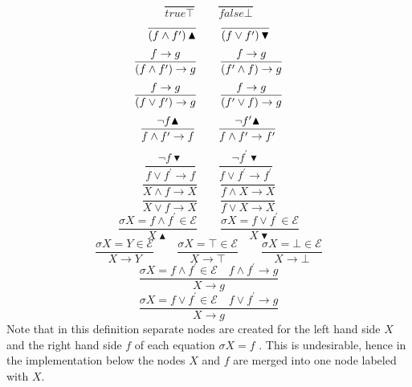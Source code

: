 \begin{equation*}
\frac{{}}{true\top }\qquad \frac{{}}{false\bot }
\end{equation*}%
\begin{equation*}
\frac{{}}{\left( f\wedge f^{\prime }\right) \blacktriangle }\qquad \frac{{}}{%
\left( f\vee f^{\prime }\right) \blacktriangledown }
\end{equation*}%
\begin{equation*}
\frac{f\rightarrow g}{(f\wedge f^{\prime })\rightarrow g}\qquad \frac{%
f\rightarrow g}{(f^{\prime }\wedge f)\rightarrow g}
\end{equation*}%
\begin{equation*}
\frac{f\rightarrow g}{(f\vee f^{\prime })\rightarrow g}\qquad \frac{%
f\rightarrow g}{(f^{\prime }\vee f)\rightarrow g}
\end{equation*}%
\begin{equation*}
\frac{\lnot f\blacktriangle }{f\wedge f^{\prime }\rightarrow f}\qquad \frac{%
\lnot f^{\prime }\blacktriangle }{f\wedge f^{\prime }\rightarrow f^{\prime }}
\end{equation*}%
\begin{equation*}
\frac{\lnot f\blacktriangledown }{f\vee f^{\prime }\rightarrow f}\qquad
\frac{\lnot f^{\prime }\blacktriangledown }{f\vee f^{\prime }\rightarrow
f^{\prime }}
\end{equation*}%
\begin{equation*}
\frac{{}}{X\wedge f\rightarrow X}\qquad \frac{{}}{f\wedge X\rightarrow X}
\end{equation*}%
\begin{equation*}
\frac{{}}{X\vee f\rightarrow X}\qquad \frac{{}}{f\vee X\rightarrow X}
\end{equation*}%
\begin{equation*}
\frac{\sigma X=f\wedge f^{\prime }\in \mathcal{E}}{X\blacktriangle }\qquad
\frac{\sigma X=f\vee f^{\prime }\in \mathcal{E}}{X\blacktriangledown }
\end{equation*}%
\begin{equation*}
\frac{\sigma X=Y\in \mathcal{E}}{X\rightarrow Y}\qquad \frac{\sigma X=\top
\in \mathcal{E}}{X\rightarrow \top }\qquad \frac{\sigma X=\bot \in \mathcal{E%
}}{X\rightarrow \bot }
\end{equation*}%
\begin{equation*}
\frac{\sigma X=f\wedge f^{\prime }\in \mathcal{E}\quad f\wedge f^{\prime
}\rightarrow g}{X\rightarrow g}
\end{equation*}%
\begin{equation*}
\frac{\sigma X=f\vee f^{\prime }\in \mathcal{E}\quad f\vee f^{\prime
}\rightarrow g}{X\rightarrow g}
\end{equation*}%
Note that in this definition separate nodes are created for the left hand
side $X$ and the right hand side $f$ of each equation $\sigma X=f$ . This is
undesirable, hence in the implementation below the nodes $X$ and $f$ are
merged into one node labeled with $X$.

